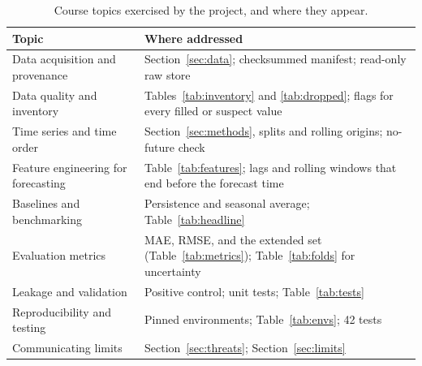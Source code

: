 \documentclass[10pt,journal,compsoc]{IEEEtran}
\begin{document}
\begin{table}[t]
\caption{Course topics exercised by the project, and where they appear.}
\label{tab:course}
\centering
\small
\begin{tabular}{@{}p{4.5cm}p{11.5cm}@{}}
\toprule
Topic & Where addressed \\
\midrule
Data acquisition and provenance & Section~\ref{sec:data}; checksummed manifest; read-only raw store \\
Data quality and inventory & Tables~\ref{tab:inventory} and \ref{tab:dropped}; flags for every filled or suspect value \\
Time series and time order & Section~\ref{sec:methods}, splits and rolling origins; no-future check \\
Feature engineering for forecasting & Table~\ref{tab:features}; lags and rolling windows that end before the forecast time \\
Baselines and benchmarking & Persistence and seasonal average; Table~\ref{tab:headline} \\
Evaluation metrics & MAE, RMSE, and the extended set (Table~\ref{tab:metrics}); Table~\ref{tab:folds} for uncertainty \\
Leakage and validation & Positive control; unit tests; Table~\ref{tab:tests} \\
Reproducibility and testing & Pinned environments; Table~\ref{tab:envs}; 42 tests \\
Communicating limits & Section~\ref{sec:threats}; Section~\ref{sec:limits} \\
\bottomrule
\end{tabular}
\end{table}
\end{document}
